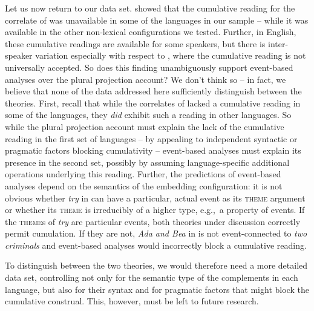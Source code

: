 \documentclass[output=paper]{langscibook}
\begin{document}
\noindent Let us now return to our data set.  showed that the cumulative reading for the correlate of  was unavailable in some of the languages in our sample -- while it was available in the other non-lexical configurations we tested. Further, in English, these cumulative readings are available for some speakers, but there is inter-speaker variation especially with respect to , where the cumulative reading is not universally accepted. So does this finding unambiguously support event-based analyses over the plural projection account? We don't think so -- in fact, we believe that none of the data addressed here sufficiently  distinguish between the theories. First, recall that while the correlates of  lacked a cumulative reading in some of the languages, they \textit{did} exhibit such a reading in other languages. So while the plural projection account  must explain the lack of the cumulative reading in the first set of languages  -- by appealing to independent syntactic or pragmatic factors blocking cumulativity -- event-based analyses must explain its presence in the second set, possibly by assuming language-specific additional operations underlying this reading. Further, the predictions of  event-based analyses depend on the semantics of the embedding configuration: it is not obvious whether \textit{try} in  can have a particular, actual event as its \textsc{theme} argument or whether its \textsc{theme} is irreducibly of a higher type, e.g.,~a property of events. If the \textsc{theme}s of \textit{try} are particular events, both theories under discussion correctly permit cumulation. If they are not, \textit{Ada and Bea} in  is not event-connected to \textit{two criminals} and event-based analyses would incorrectly block a cumulative reading.

To distinguish between the two theories, we would therefore need a more detailed data set, controlling not only for the semantic type of the complements in each language, but also for their syntax and for pragmatic factors that might block the cumulative construal. This, however, must be left to future research.
\end{document}
